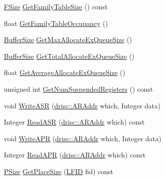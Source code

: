 \begin{DoxyCompactItemize}
\item 
\hyperlink{namespace_simulator_a06544009313d7c13d411b1c074e5acff}{F\+Size} \hyperlink{class_simulator_1_1_d_r_i_s_c_aa922f0c4f46e14d5421339cfdd23cfd2}{Get\+Family\+Table\+Size} () const 
\item 
float \hyperlink{class_simulator_1_1_d_r_i_s_c_a88e7c4bb3ed9546f114b7e60a12625ff}{Get\+Family\+Table\+Occupancy} ()
\item 
\hyperlink{namespace_simulator_a5ca279f926485be2d0554e41275a3305}{Buffer\+Size} \hyperlink{class_simulator_1_1_d_r_i_s_c_a140a034147286f5fd4915c4563b7d576}{Get\+Max\+Allocate\+Ex\+Queue\+Size} ()
\item 
\hyperlink{namespace_simulator_a5ca279f926485be2d0554e41275a3305}{Buffer\+Size} \hyperlink{class_simulator_1_1_d_r_i_s_c_ae655512d4b1fcc2f0a3a69a4e99c83b3}{Get\+Total\+Allocate\+Ex\+Queue\+Size} ()
\item 
float \hyperlink{class_simulator_1_1_d_r_i_s_c_a35f8cc6087a6fec637eba3276ce3a4a6}{Get\+Average\+Allocate\+Ex\+Queue\+Size} ()
\item 
unsigned int \hyperlink{class_simulator_1_1_d_r_i_s_c_ae644a700636dc634f59f772d9b0885a9}{Get\+Num\+Suspended\+Registers} () const 
\item 
void \hyperlink{class_simulator_1_1_d_r_i_s_c_a2f141ba7eff1ae273031bbfec1680bf0}{Write\+A\+S\+R} (\hyperlink{namespace_simulator_1_1drisc_ad67fa6022bb8dfc914132e37bbba2e97}{drisc\+::\+A\+R\+Addr} which, Integer data)
\item 
Integer \hyperlink{class_simulator_1_1_d_r_i_s_c_ad485afd4103a3fcfd7b3ac69cecaab69}{Read\+A\+S\+R} (\hyperlink{namespace_simulator_1_1drisc_ad67fa6022bb8dfc914132e37bbba2e97}{drisc\+::\+A\+R\+Addr} which) const 
\item 
void \hyperlink{class_simulator_1_1_d_r_i_s_c_a817b71681290c747896a21904a174a79}{Write\+A\+P\+R} (\hyperlink{namespace_simulator_1_1drisc_ad67fa6022bb8dfc914132e37bbba2e97}{drisc\+::\+A\+R\+Addr} which, Integer data)
\item 
Integer \hyperlink{class_simulator_1_1_d_r_i_s_c_a59cb242882b13731d79bcdcfbf9281fd}{Read\+A\+P\+R} (\hyperlink{namespace_simulator_1_1drisc_ad67fa6022bb8dfc914132e37bbba2e97}{drisc\+::\+A\+R\+Addr} which) const 
\item 
\hyperlink{namespace_simulator_a4aa07bee2f34beac11abf48a8ccc47c4}{P\+Size} \hyperlink{class_simulator_1_1_d_r_i_s_c_a0f795f33db2370869329a3a6bf45ca2b}{Get\+Place\+Size} (\hyperlink{namespace_simulator_aaccbc706b2d6c99085f52f6dfc2333e4}{L\+F\+I\+D} fid) const 
\item 

\end{DoxyCompactItemize}
